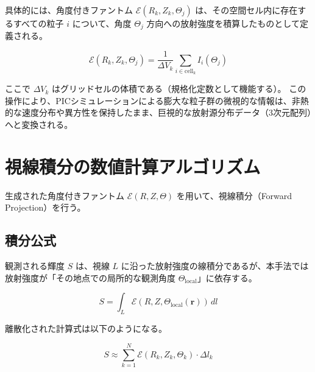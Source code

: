 \documentclass[a4paper,11pt]{bxjsarticle} %
\begin{document}
具体的には、角度付きファントム $\mathcal{E}(R_k, Z_k, \Theta_j)$ は、その空間セル内に存在するすべての粒子 $i$ について、角度 $\Theta_j$ 方向への放射強度を積算したものとして定義される。

\begin{equation}
    \mathcal{E}(R_k, Z_k, \Theta_j) = \frac{1}{\Delta V_k} \sum_{i \in \text{cell}_k} I_i(\Theta_j)
\end{equation}

ここで $\Delta V_k$ はグリッドセルの体積である（規格化定数として機能する）。
この操作により、PICシミュレーションによる膨大な粒子群の微視的な情報は、非熱的な速度分布や異方性を保持したまま、巨視的な放射源分布データ（3次元配列）へと変換される。

\section{視線積分の数値計算アルゴリズム}

生成された角度付きファントム $\mathcal{E}(R, Z, \Theta)$ を用いて、視線積分（Forward Projection）を行う。

\subsection{積分公式}
観測される輝度 $S$ は、視線 $L$ に沿った放射強度の線積分であるが、本手法では放射強度が「その地点での局所的な観測角度 $\Theta_{\mathrm{local}}$」に依存する。

\begin{equation}
    S = \int_{L} \mathcal{E}(R, Z, \Theta_{\mathrm{local}}(\bm{r})) \, dl
\end{equation}

離散化された計算式は以下のようになる。

\begin{equation}
    S \approx \sum_{k=1}^{N} \mathcal{E}(R_k, Z_k, \Theta_k) \cdot \Delta l_k
\end{equation}
\end{document}
